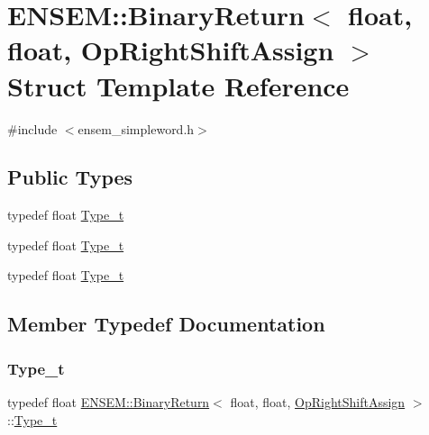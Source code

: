 \hypertarget{structENSEM_1_1BinaryReturn_3_01float_00_01float_00_01OpRightShiftAssign_01_4}{}\section{E\+N\+S\+EM\+:\+:Binary\+Return$<$ float, float, Op\+Right\+Shift\+Assign $>$ Struct Template Reference}
\label{structENSEM_1_1BinaryReturn_3_01float_00_01float_00_01OpRightShiftAssign_01_4}


{\ttfamily \#include $<$ensem\+\_\+simpleword.\+h$>$}

\subsection*{Public Types}
\begin{DoxyCompactItemize}
\item 
typedef float \mbox{\hyperlink{structENSEM_1_1BinaryReturn_3_01float_00_01float_00_01OpRightShiftAssign_01_4_a79bb667fa95c821edd1a65ad18229767}{Type\+\_\+t}}
\item 
typedef float \mbox{\hyperlink{structENSEM_1_1BinaryReturn_3_01float_00_01float_00_01OpRightShiftAssign_01_4_a79bb667fa95c821edd1a65ad18229767}{Type\+\_\+t}}
\item 
typedef float \mbox{\hyperlink{structENSEM_1_1BinaryReturn_3_01float_00_01float_00_01OpRightShiftAssign_01_4_a79bb667fa95c821edd1a65ad18229767}{Type\+\_\+t}}
\end{DoxyCompactItemize}


\subsection{Member Typedef Documentation}
\mbox{\label{structENSEM_1_1BinaryReturn_3_01float_00_01float_00_01OpRightShiftAssign_01_4_a79bb667fa95c821edd1a65ad18229767}} 
\subsubsection{\texorpdfstring{Type\_t}{Type\_t}\hspace{0.1cm}{\footnotesize\ttfamily [1/3]}}
{\footnotesize\ttfamily typedef float \mbox{\hyperlink{structENSEM_1_1BinaryReturn}{E\+N\+S\+E\+M\+::\+Binary\+Return}}$<$ float, float, \mbox{\hyperlink{structENSEM_1_1OpRightShiftAssign}{Op\+Right\+Shift\+Assign}} $>$\+::\mbox{\hyperlink{structENSEM_1_1BinaryReturn_3_01float_00_01float_00_01OpRightShiftAssign_01_4_a79bb667fa95c821edd1a65ad18229767}{Type\+\_\+t}}}

